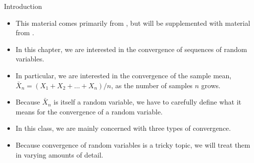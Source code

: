 \begin{frame}[allowframebreaks]{Introduction}
  \begin{itemize}
    \item This material comes primarily from \citet[][Chapter~5]{rice07}, but will be supplemented with material from \citet[][Chapter~5]{casella24}.
    \item In this chapter, we are interested in the convergence of sequences of random variables.
    \item In particular, we are interested in the convergence of the sample mean, $\bar{X}_n = (X_1 + X_2 + \ldots + X_n) / n$, as the number of samples $n$ grows.
    \item Because $\bar{X}_n$ is itself a random variable, we have to carefully define what it means for the convergence of a random variable.
    \item In this class, we are mainly concerned with three types of convergence.
    \item Because convergence of random variables is a tricky topic, we will treat them in varying amounts of detail.
  \end{itemize}
\end{frame}

